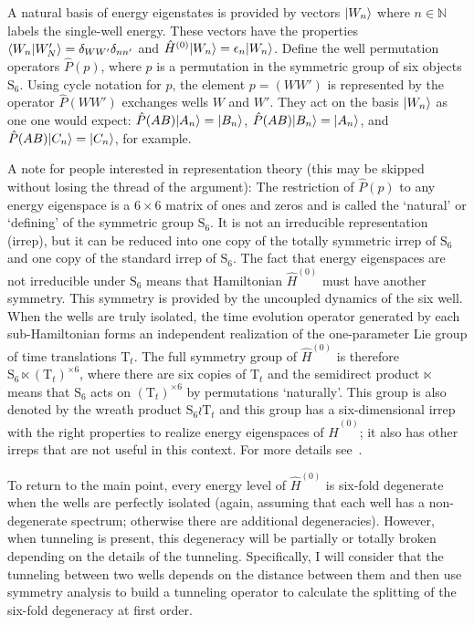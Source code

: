 A natural basis of energy eigenstates is provided by vectors $|W_n\rangle$ where $n\in\mathbb{N}$ labels the single-well energy. These vectors have the properties $\langle W_n|W'_N\rangle = \delta_{WW'}\delta_{nn'}$ and $\hat{H}^{(0)}|W_n\rangle = \epsilon_n|W_n\rangle$. Define the well permutation operators $\hat{P}(p)$, where $p$ is a permutation in the symmetric group of six objects $\mathrm{S}_6$. Using cycle notation for $p$, the element $p=(WW')$ is represented by the operator $\hat{P}(WW')$ exchanges wells $W$ and $W'$. They act on the basis $|W_n\rangle$ as one one would expect: $\hat{P}(AB)|A_n\rangle = |B_n\rangle$, $\hat{P}(AB)|B_n\rangle = |A_n\rangle$, and $\hat{P}(AB)|C_n\rangle = |C_n\rangle$, for example. 

A note for people interested in representation theory (this may be skipped without losing the thread of the argument): The restriction of $\hat{P}(p)$ to any energy eigenspace is a $6\times 6$ matrix of ones and zeros and is called the `natural' or `defining' of the symmetric group $\mathrm{S}_6$. It is not an irreducible representation (irrep), but it can be reduced into one copy of the totally symmetric irrep  of $\mathrm{S}_6$ and one copy of the standard irrep of $\mathrm{S}_6$. The fact that energy eigenspaces are not irreducible under $\mathrm{S}_6$ means that Hamiltonian $\hat{H}^{(0)}$ must have another symmetry. This symmetry is provided by the uncoupled dynamics of the six well. When the wells are truly isolated, the time evolution operator generated by each sub-Hamiltonian forms an independent realization of the one-parameter Lie group of time translations $\mathrm{T}_t$. The full symmetry group of $\hat{H}^{(0)}$ is therefore $\mathrm{S}_6 \ltimes (\mathrm{T}_t)^{\times 6}$, where  there are six copies of $\mathrm{T}_t$ and the semidirect product $\ltimes$ means that $\mathrm{S}_6$ acts on $(\mathrm{T}_t)^{\times 6}$  by permutations `naturally'. This group is also denoted by the wreath product $\mathrm{S}_6 \wr \mathrm{T}_t$ and this group has a six-dimensional irrep with the right properties to realize energy eigenspaces of $\hat{H}^{(0)}$; it also has other irreps that are not useful in this context. For more details see~\cite{Harshman2016b, harshman2016c, harshman2016a}.

To return to the main point, every energy level of $\hat{H}^{(0)}$ is six-fold degenerate when the wells are perfectly isolated (again, assuming that each well has a non-degenerate spectrum; otherwise there are additional degeneracies). However, when tunneling is present, this degeneracy will be partially or totally broken depending on the details of the tunneling. Specifically, I will consider that the tunneling between two wells depends on the distance between them and then use symmetry analysis to build a tunneling operator to calculate the splitting of the six-fold degeneracy at first order.

